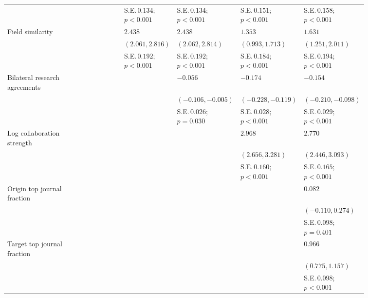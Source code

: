 \begin{table}[H]
{\begin{tabular}{p{0.2\linewidth}p{0.11\linewidth}p{0.11\linewidth}p{0.11\linewidth}p{0.11\linewidth}p{0.11\linewidth}p{0.11\linewidth}}
 &  &  & S.E.\,$0.134$; ${p < 0.001}$ & S.E.\,$0.134$; ${p < 0.001}$ & S.E.\,$0.151$; ${p < 0.001}$ & S.E.\,$0.158$; ${p < 0.001}$\\ [0.8ex]  
Field similarity &  &  & $2.438$ & $2.438$ & $1.353$ & $1.631$\\ 
 &  &  & $(2.061, 2.816)$ & $(2.062, 2.814)$ & $(0.993, 1.713)$ & $(1.251, 2.011)$\\ 
 &  &  & S.E.\,$0.192$; ${p < 0.001}$ & S.E.\,$0.192$; ${p < 0.001}$ & S.E.\,$0.184$; ${p < 0.001}$ & S.E.\,$0.194$; ${p < 0.001}$\\ [0.8ex]  
Bilateral research agreements &  &  &  & $-0.056$ & $-0.174$ & $-0.154$\\ 
 &  &  &  & $(-0.106, -0.005)$ & $(-0.228, -0.119)$ & $(-0.210, -0.098)$\\ 
 &  &  &  & S.E.\,$0.026$; ${p = 0.030}$ & S.E.\,$0.028$; ${p < 0.001}$ & S.E.\,$0.029$; ${p < 0.001}$\\ [0.8ex]  
Log collaboration strength &  &  &  &  & $2.968$ & $2.770$\\ 
 &  &  &  &  & $(2.656, 3.281)$ & $(2.446, 3.093)$\\ 
 &  &  &  &  & S.E.\,$0.160$; ${p < 0.001}$ & S.E.\,$0.165$; ${p < 0.001}$\\ [0.8ex]  
Origin top journal fraction &  &  &  &  &  & $0.082$\\ 
 &  &  &  &  &  & $(-0.110, 0.274)$\\ 
 &  &  &  &  &  & S.E.\,$0.098$; ${p = 0.401}$\\ [0.8ex]  
Target top journal fraction &  &  &  &  &  & $0.966$\\ 
 &  &  &  &  &  & $(0.775, 1.157)$\\ 
 &  &  &  &  &  & S.E.\,$0.098$; ${p < 0.001}$\\ [0.8ex]  
\hline 
\end{tabular}
}
\end{table}
